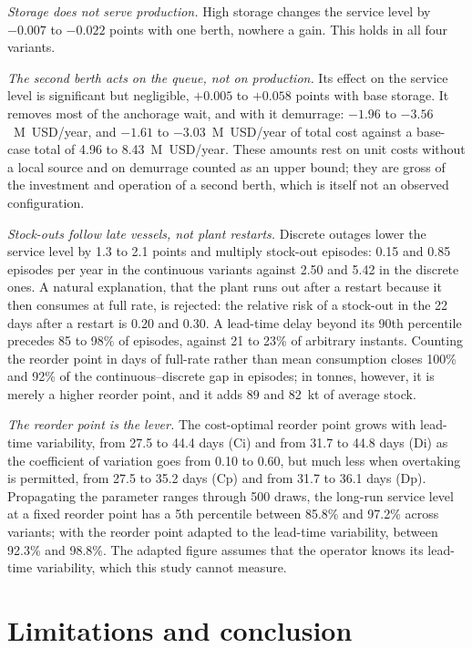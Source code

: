 \documentclass[conference]{IEEEtran}   %
\begin{document}
\emph{Storage does not serve production.} High storage changes the service level by
$-0.007$ to $-0.022$ points with one berth, nowhere a gain. This holds in all four variants.

\emph{The second berth acts on the queue, not on production.} Its effect on the service level
is significant but negligible, $+0.005$ to $+0.058$ points with base storage. It removes most
of the anchorage wait, and with it demurrage: $-1.96$ to $-3.56$~M~USD/year, and $-1.61$ to
$-3.03$~M~USD/year of total cost against a base-case total of 4.96 to 8.43~M~USD/year. These
amounts rest on unit costs without a local source and on demurrage counted as an upper bound;
they are gross of the investment and operation of a second berth, which is itself not an
observed configuration.

\emph{Stock-outs follow late vessels, not plant restarts.} Discrete outages lower the service
level by 1.3 to 2.1 points and multiply stock-out episodes: 0.15 and 0.85 episodes per year
in the continuous variants against 2.50 and 5.42 in the discrete ones. A natural explanation,
that the plant runs out after a restart because it then consumes at full rate, is rejected:
the relative risk of a stock-out in the 22 days after a restart is 0.20 and 0.30. A lead-time
delay beyond its 90th percentile precedes 85 to 98\% of episodes, against 21 to 23\% of
arbitrary instants. Counting the reorder point in days of full-rate rather than mean
consumption closes 100\% and 92\% of the continuous--discrete gap in episodes; in tonnes,
however, it is merely a higher reorder point, and it adds 89 and 82~kt of average stock.

\emph{The reorder point is the lever.} The cost-optimal reorder point grows with lead-time
variability, from 27.5 to 44.4 days (Ci) and from 31.7 to 44.8 days (Di) as the coefficient
of variation goes from 0.10 to 0.60, but much less when overtaking is permitted, from 27.5
to 35.2 days (Cp) and from 31.7 to 36.1 days (Dp). Propagating the parameter ranges through 500 draws, the long-run service level at
a fixed reorder point has a 5th percentile between 85.8\% and 97.2\% across variants; with
the reorder point adapted to the lead-time variability, between 92.3\% and 98.8\%. The
adapted figure assumes that the operator knows its lead-time variability, which this study
cannot measure.

\section{Limitations and conclusion}
\label{sec:limits}
\end{document}
